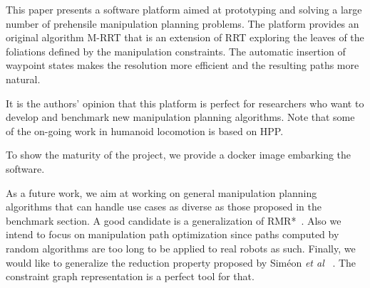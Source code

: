 This paper presents a software platform aimed at prototyping and
solving a large number of prehensile manipulation planning
problems. The platform provides an original algorithm M-RRT that is an
extension of RRT exploring the leaves of the foliations defined by the
manipulation constraints. The automatic insertion of waypoint states
makes the resolution more efficient and the resulting paths more
natural.

It is the authors' opinion that this platform is perfect for researchers who want to
develop and benchmark new manipulation planning algorithms. Note that some
of the on-going work in humanoid locomotion  \cite{tonneau-2018} is based on HPP.

To show the maturity of the project, we provide a docker image embarking the
software.

As a future work, we aim at working on general manipulation planning algorithms
that can handle use cases as diverse as those proposed in the benchmark section.
A good candidate is a generalization of RMR*~\cite{schmitt17icra}. Also we intend to focus on manipulation path optimization since paths computed by
random algorithms are too long to be applied to real robots as such. {\color{blue}Finally, we would like to generalize the reduction property proposed by Siméon
  \textit{et al}~\cite{simeon2004ijrr} . The constraint graph representation is
  a perfect tool for that.}
